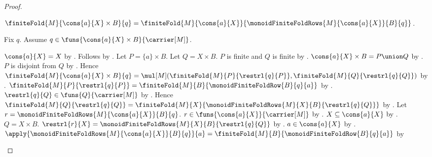 \begin{proof}
\begin{subproof}
            $\finiteFold{M}{\cons{a}{X}\times B}{q}
            =\finiteFold{M}{\cons{a}{X}}{
                \monoidFiniteFoldRows{M}{\cons{a}{X}}{B}{q}}$.
        \begin{subproof}
            Fix $q$.
            Assume $q\in\funs{\cons{a}{X}\times B}{\carrier[M]}$.
            \begin{byCase}
                $\cons{a}{X}=X$ by .
                Follows by \auto.
                Let $P=\{a\}\times B$.
                Let $Q=X\times B$.
                $P$ is finite and $Q$ is finite by
                    .
                $\cons{a}{X}\times B=P\union Q$ by
                    .
                $P$ is disjoint from $Q$ by
                    .
                Hence
                    $\finiteFold{M}{\cons{a}{X}\times B}{q}
                    =\mul[M](
                        \finiteFold{M}{P}{\restrl{q}{P}},
                        \finiteFold{M}{Q}{\restrl{q}{Q}})$ by
                    .
                $\finiteFold{M}{P}{\restrl{q}{P}}
                    =\finiteFold{M}{B}{
                        \monoidFiniteFoldRow{B}{q}{a}}$ by
                    .
                $\restrl{q}{Q}\in\funs{Q}{\carrier[M]}$ by
                    .
                Hence
                    $\finiteFold{M}{Q}{\restrl{q}{Q}}
                    =\finiteFold{M}{X}{
                        \monoidFiniteFoldRows{M}{X}{B}{
                            \restrl{q}{Q}}}$ by \auto.
                Let $r=\monoidFiniteFoldRows{M}{\cons{a}{X}}{B}{q}$.
                $r\in\funs{\cons{a}{X}}{\carrier[M]}$ by
                    .
                $X\subseteq\cons{a}{X}$ by
                    .
                $Q=X\times B$.
                $\restrl{r}{X}
                    =\monoidFiniteFoldRows{M}{X}{B}{
                        \restrl{q}{Q}}$ by
                    .
                $a\in\cons{a}{X}$ by .
                $\apply{\monoidFiniteFoldRows{M}{\cons{a}{X}}{B}{q}}{a}
                    =\finiteFold{M}{B}{
                        \monoidFiniteFoldRow{B}{q}{a}}$ by

\end{byCase}
\end{subproof}
\end{subproof}
\end{proof}
